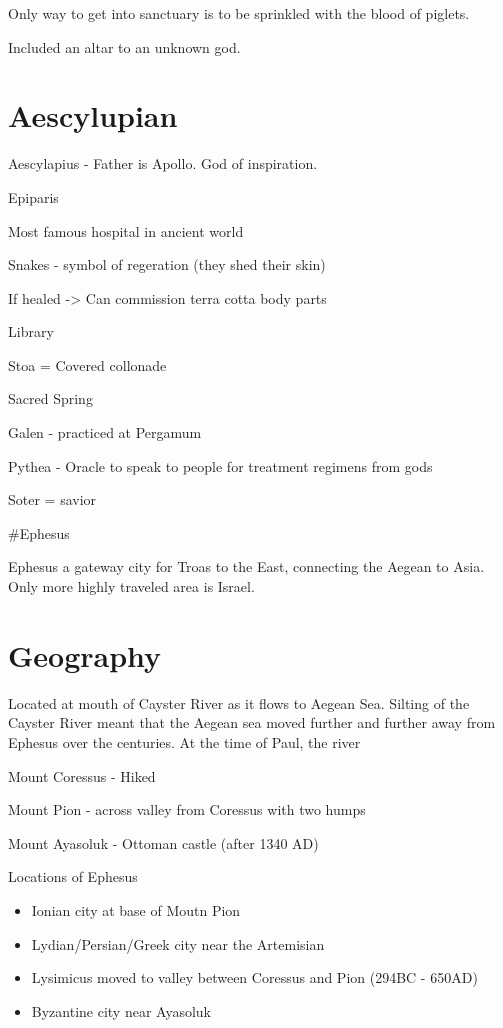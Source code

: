 \documentclass[
]{book}
\providecommand{\tightlist}{%
  \setlength{\itemsep}{0pt}\setlength{\parskip}{0pt}}
\begin{document}
Only way to get into sanctuary is to be sprinkled with the blood of piglets.

Included an altar to an unknown god.

\hypertarget{aescylupian}{%
\section{Aescylupian}\label{aescylupian}}

Aescylapius - Father is Apollo. God of inspiration.

Epiparis

Most famous hospital in ancient world

Snakes - symbol of regeration (they shed their skin)

If healed -\textgreater{} Can commission terra cotta body parts

Library

Stoa = Covered collonade

Sacred Spring

Galen - practiced at Pergamum

Pythea - Oracle to speak to people for treatment regimens from gods

Soter = savior

\#Ephesus

Ephesus a gateway city for Troas to the East, connecting the Aegean to Asia. Only more highly traveled area is Israel.

\hypertarget{geography-6}{%
\section{Geography}\label{geography-6}}

Located at mouth of Cayster River as it flows to Aegean Sea. Silting of the Cayster River meant that the Aegean sea moved further and further away from Ephesus over the centuries. At the time of Paul, the river

Mount Coressus - Hiked

Mount Pion - across valley from Coressus with two humps

Mount Ayasoluk - Ottoman castle (after 1340 AD)

Locations of Ephesus

\begin{itemize}
\tightlist
\item
  Ionian city at base of Moutn Pion
\item
  Lydian/Persian/Greek city near the Artemisian
\item
  Lysimicus moved to valley between Coressus and Pion (294BC - 650AD)
\item
  Byzantine city near Ayasoluk
\end{itemize}
\end{document}
